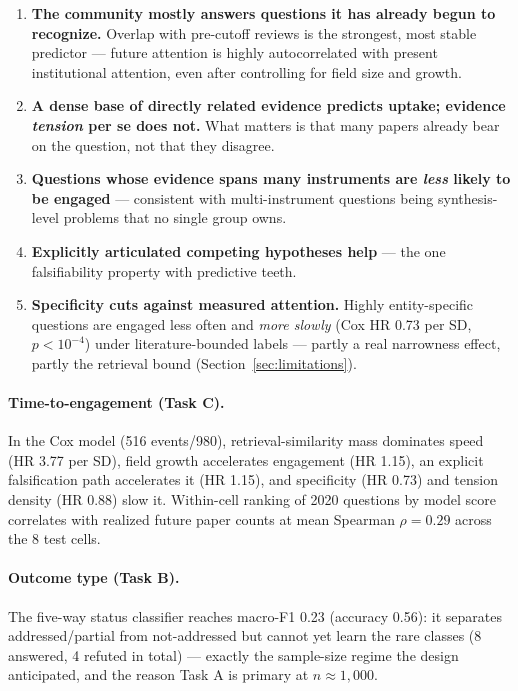 \documentclass[11pt]{article}
\begin{document}
\begin{enumerate}
  \item \textbf{The community mostly answers questions it has already
    begun to recognize.} Overlap with pre-cutoff reviews is the
    strongest, most stable predictor --- future attention is highly
    autocorrelated with present institutional attention, even after
    controlling for field size and growth.
  \item \textbf{A dense base of directly related evidence predicts
    uptake; evidence \emph{tension} per se does not.} What matters is
    that many papers already bear on the question, not that they
    disagree.
  \item \textbf{Questions whose evidence spans many instruments are
    \emph{less} likely to be engaged} --- consistent with
    multi-instrument questions being synthesis-level problems that no
    single group owns.
  \item \textbf{Explicitly articulated competing hypotheses help} ---
    the one falsifiability property with predictive teeth.
  \item \textbf{Specificity cuts against measured attention.} Highly
    entity-specific questions are engaged less often and \emph{more
    slowly} (Cox HR 0.73 per SD, $p<10^{-4}$) under literature-bounded
    labels --- partly a real narrowness effect, partly the retrieval
    bound (Section~\ref{sec:limitations}).
\end{enumerate}

\paragraph{Time-to-engagement (Task C).} In the Cox model (516
events/980), retrieval-similarity mass dominates speed (HR 3.77 per SD),
field growth accelerates engagement (HR 1.15), an explicit falsification
path accelerates it (HR 1.15), and specificity (HR 0.73) and tension
density (HR 0.88) slow it. Within-cell ranking of 2020 questions by
model score correlates with realized future paper counts at mean
Spearman $\rho = 0.29$ across the 8 test cells.

\paragraph{Outcome type (Task B).} The five-way status classifier
reaches macro-F1 0.23 (accuracy 0.56): it separates addressed/partial
from not-addressed but cannot yet learn the rare classes (8 answered,
4 refuted in total) --- exactly the sample-size regime the design
anticipated, and the reason Task A is primary at $n \approx 1{,}000$.
\end{document}
